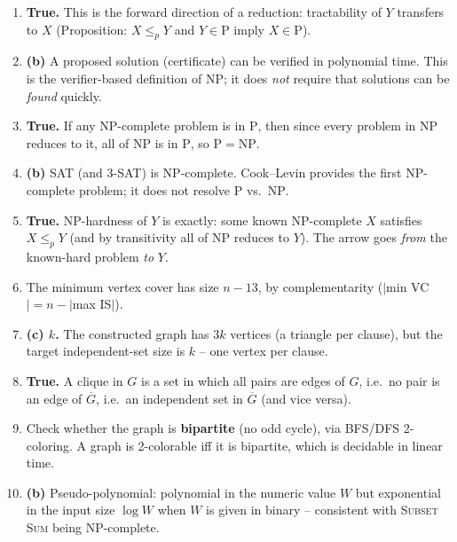 \documentclass[11pt]{article}
\begin{document}
\begin{enumerate}[label=\textbf{B\arabic*.}, leftmargin=2.2em]

\item \textbf{True.} This is the forward direction of a reduction: tractability of $Y$
transfers to $X$ (Proposition: $X \le_p Y$ and $Y \in \mathrm{P}$ imply $X \in \mathrm{P}$).

\item \textbf{(b)} A proposed solution (certificate) can be verified in polynomial time.
This is the verifier-based definition of $\mathrm{NP}$; it does \emph{not} require that
solutions can be \emph{found} quickly.

\item \textbf{True.} If any NP-complete problem is in $\mathrm{P}$, then since every problem
in $\mathrm{NP}$ reduces to it, all of $\mathrm{NP}$ is in $\mathrm{P}$, so $\mathrm{P} =
\mathrm{NP}$.

\item \textbf{(b)} \textsc{SAT} (and \textsc{3-SAT}) is NP-complete. Cook--Levin provides
the first NP-complete problem; it does not resolve $\mathrm{P}$ vs.\ $\mathrm{NP}$.

\item \textbf{True.} NP-hardness of $Y$ is exactly: some known NP-complete $X$ satisfies $X
\le_p Y$ (and by transitivity all of $\mathrm{NP}$ reduces to $Y$). The arrow goes
\emph{from} the known-hard problem \emph{to} $Y$.

\item The minimum vertex cover has size $n - 13$, by complementarity ($|$min VC$| = n -
|$max IS$|$).

\item \textbf{(c) $k$.} The constructed graph has $3k$ vertices (a triangle per clause), but
the target independent-set size is $k$ -- one vertex per clause.

\item \textbf{True.} A clique in $G$ is a set in which all pairs are edges of $G$, i.e.\ no
pair is an edge of $\overline{G}$, i.e.\ an independent set in $\overline{G}$ (and vice
versa).

\item Check whether the graph is \textbf{bipartite} (no odd cycle), via BFS/DFS 2-coloring.
A graph is 2-colorable iff it is bipartite, which is decidable in linear time.

\item \textbf{(b)} Pseudo-polynomial: polynomial in the numeric value $W$ but exponential
in the input size $\log W$ when $W$ is given in binary -- consistent with \textsc{Subset
Sum} being NP-complete.

\end{enumerate}
\end{document}
